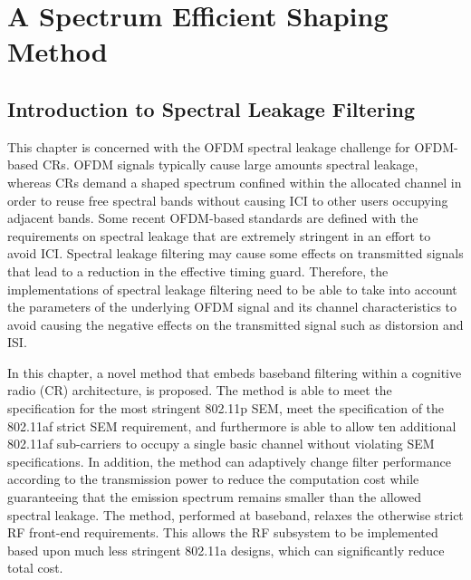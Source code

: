 \chapter{A Spectrum Efficient Shaping Method}
\label{chap:SpectralLeakage}

\section{Introduction to Spectral Leakage Filtering}
\label{Sec:Intro}

This chapter is concerned with the OFDM spectral leakage challenge for OFDM-based CRs.
OFDM signals typically cause large amounts spectral leakage, whereas CRs demand a shaped spectrum confined within the allocated channel in order to reuse free spectral bands without causing ICI to other users occupying adjacent bands.
Some recent OFDM-based standards are defined with the requirements on spectral leakage that are extremely stringent in an effort  to avoid ICI.
Spectral leakage filtering may cause some effects on transmitted signals that lead to a reduction in the effective timing guard.
Therefore, the implementations of spectral leakage filtering need to be able to take into account the parameters of the underlying OFDM signal and its channel characteristics to avoid causing the negative effects on the transmitted signal such as distorsion and ISI.

In this chapter, a novel method that embeds baseband filtering within a cognitive radio (CR) architecture, is proposed. 
The method is able to meet the specification for the most stringent 802.11p SEM, meet the specification of the 802.11af strict SEM requirement, and furthermore is able to allow ten additional 802.11af sub-carriers to occupy a single basic channel without violating SEM specifications. 
In addition, the method can adaptively change filter performance according to the transmission power to reduce the computation cost while guaranteeing that the emission spectrum remains smaller than the allowed spectral leakage.
The method, performed at baseband, relaxes the otherwise strict RF front-end requirements. 
This allows the RF subsystem to be implemented based upon much less stringent 802.11a designs, which can significantly reduce total cost.

